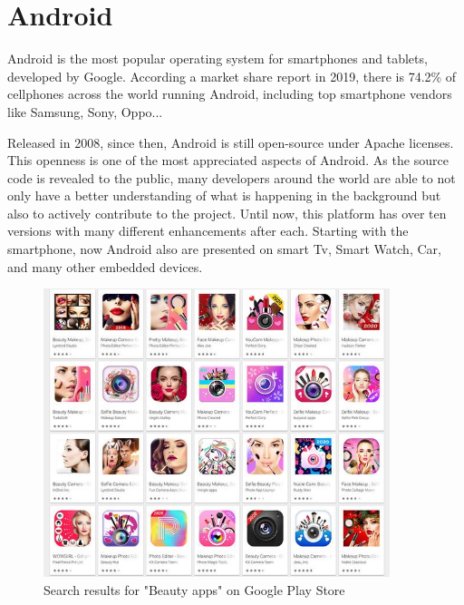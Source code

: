 \section{Android} \label{sec:android}

Android is the most popular operating system for smartphones and tablets, developed by Google. According a market share report in 2019, there is 74.2\% of cellphones across the world running Android, including top smartphone vendors like Samsung, Sony, Oppo... \par

Released in 2008, since then, Android is still open-source under Apache licenses. This openness is one of the most appreciated aspects of Android. As the source code is revealed to the public, many developers around the world are able to not only have a better understanding of what is happening in the background but also to actively contribute to the project. Until now, this platform has over ten versions with many different enhancements after each. Starting with the smartphone, now Android also are presented on smart Tv, Smart Watch, Car, and many other embedded devices. \par

\begin{figure} [H]
    \centering
    \includegraphics[trim=20 40 20 40,clip,width=0.9\textwidth]{chapter2/image/chplay.jpeg}
    \caption{Search results for "Beauty apps" on Google Play Store}
    \label{fig:android}
\end{figure}


